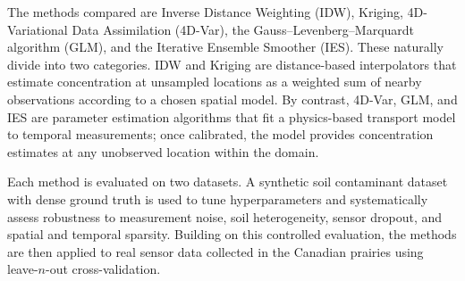 The methods compared are Inverse Distance Weighting (IDW), Kriging, 4D-Variational Data Assimilation (4D-Var), the Gauss--Levenberg--Marquardt algorithm (GLM), and the Iterative Ensemble Smoother (IES). These naturally divide into two categories. IDW and Kriging are distance-based interpolators that estimate concentration at unsampled locations as a weighted sum of nearby observations according to a chosen spatial model. By contrast, 4D-Var, GLM, and IES are parameter estimation algorithms that fit a physics-based transport model to temporal measurements; once calibrated, the model provides concentration estimates at any unobserved location within the domain.

Each method is evaluated on two datasets. A synthetic soil contaminant dataset with dense ground truth is used to tune hyperparameters and systematically assess robustness to measurement noise, soil heterogeneity, sensor dropout, and spatial and temporal sparsity. Building on this controlled evaluation, the methods are then applied to real sensor data collected in the Canadian prairies using leave-$n$-out cross-validation.

